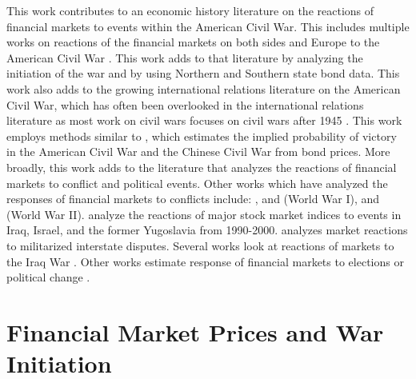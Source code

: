 \documentclass[]{article}\usepackage[]{graphicx}\usepackage[]{color}
\begin{document}
This work contributes to an economic history literature on the reactions of financial markets to events within the American Civil War.
This includes multiple works on reactions of the financial markets on both sides and Europe to the American Civil War \parencites{Schwab1901}{Mitchell1903}{WillardGuinnaneEtAl1996}{McCandless1996}{SmithSmith1997}{BrownBurdekin2000}{Weidenmier2002}.
This work adds to that literature by analyzing the initiation of the war and by using Northern and Southern state bond data.
This work also adds to the growing international relations literature on the American Civil War, which has often been overlooked in the international relations literature as most work on civil wars focuses on civil wars after 1945 \parencites{Poast2012}{Reiter2009}.
This work employs methods similar to \textcite{HaberMitchenerOosterlinckEtAl2015}, which estimates the implied probability of victory in the American Civil War and the Chinese Civil War from bond prices.
More broadly, this work adds to the literature that analyzes the reactions of financial markets to conflict and political events.
Other works which have analyzed the responses of financial markets to conflicts include: \textcite{Bueno1990}, \textcite{Hall2004} and \textcite{Ferguson2006} (World War I), and \textcites{WaldenstromFrey2008}{WaldenstromFrey2008} (World War II).
\textcite{SchneiderTroeger2006} analyze the reactions of major stock market indices to events in Iraq, Israel, and the former Yugoslavia from 1990-2000.
\textcite{GuidolinLaFerrara2010} analyzes market reactions to militarized interstate disputes.
Several works look at reactions of markets to the Iraq War \parencites{RigobonSack2005}{LeighWolfersEtAl2003}{WolfersZitzewitz2009}.
Other works estimate response of financial markets to elections or political change \parencites{Jayachandr2006}{Herron2000}.

\section{Financial Market Prices and War Initiation}
\label{sec:risky-bond-pricing}
\end{document}
